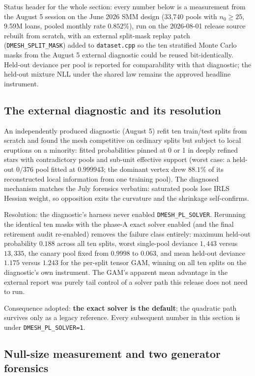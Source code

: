 \documentclass[11pt]{article}
\begin{document}
Status header for the whole section: every number below is a measurement from
the August 5 session on the June 2026 SMM design (33{,}740 pools with
$n_0\ge 25$, 9.59M loans, pooled monthly rate $0.852\%$), run on the
2026-08-01 release source rebuilt from scratch, with an external split-mask
replay patch (\texttt{DMESH\_SPLIT\_MASK}) added to \texttt{dataset.cpp} so
the ten stratified Monte Carlo masks from the August 5 external diagnostic
could be reused bit-identically. Held-out deviance per pool is reported for
comparability with that diagnostic; the held-out mixture NLL under the shared
law remains the approved headline instrument.

\subsection{The external diagnostic and its resolution}

An independently produced diagnostic (August 5) refit ten train/test splits
from scratch and found the mesh competitive on ordinary splits but subject to
local eruptions on a minority: fitted probabilities pinned at 0 or 1 in
deeply refined stars with contradictory pools and sub-unit effective support
(worst case: a held-out $0/376$ pool fitted at $0.999943$; the dominant
vertex drew $88.1\%$ of its reconstructed local information from one training
pool). The diagnosed mechanism matches the July forensics verbatim: saturated
pools lose IRLS Hessian weight, so opposition exits the curvature and the
shrinkage self-confirms.

Resolution: the diagnostic's harness never enabled
\texttt{DMESH\_PL\_SOLVER}. Rerunning the identical ten masks with the
phase-A exact solver enabled (and the final retirement audit re-enabled)
removes the failure class entirely: maximum held-out probability $0.188$
across all ten splits, worst single-pool deviance $1{,}443$ versus
$13{,}335$, the canary pool fixed from $0.9998$ to $0.063$, and mean
held-out deviance $1.175$ versus $1.243$ for the per-split tensor GAM,
winning on all ten splits on the diagnostic's own instrument. The GAM's
apparent mean advantage in the external report was purely tail control of a
solver path this release does not need to run.

Consequence adopted: \textbf{the exact solver is the default}; the quadratic
path survives only as a legacy reference. Every subsequent number in this
section is under \texttt{DMESH\_PL\_SOLVER=1}.

\subsection{Null-size measurement and two generator forensics}
\end{document}
